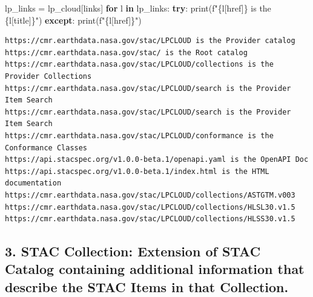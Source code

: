\documentclass[
  letterpaper,
]{scrartcl}
\newenvironment{Shaded}{}{}
\newcommand{\BuiltInTok}[1]{#1}
\newcommand{\ControlFlowTok}[1]{\textcolor[rgb]{0.00,0.44,0.13}{\textbf{#1}}}
\newcommand{\KeywordTok}[1]{\textcolor[rgb]{0.00,0.44,0.13}{\textbf{#1}}}
\newcommand{\NormalTok}[1]{#1}
\newcommand{\OperatorTok}[1]{\textcolor[rgb]{0.40,0.40,0.40}{#1}}
\newcommand{\SpecialCharTok}[1]{\textcolor[rgb]{0.25,0.44,0.63}{#1}}
\newcommand{\SpecialStringTok}[1]{\textcolor[rgb]{0.73,0.40,0.53}{#1}}
\newcommand{\StringTok}[1]{\textcolor[rgb]{0.25,0.44,0.63}{#1}}
\begin{document}
\begin{Shaded}
\begin{Highlighting}[]
\NormalTok{lp\_links }\OperatorTok{=}\NormalTok{ lp\_cloud[}\StringTok{\textquotesingle{}links\textquotesingle{}}\NormalTok{]}
\ControlFlowTok{for}\NormalTok{ l }\KeywordTok{in}\NormalTok{ lp\_links: }
    \ControlFlowTok{try}\NormalTok{: }
        \BuiltInTok{print}\NormalTok{(}\SpecialStringTok{f"}\SpecialCharTok{\{l}\NormalTok{[}\StringTok{\textquotesingle{}href\textquotesingle{}}\NormalTok{]}\SpecialCharTok{\}}\SpecialStringTok{ is the }\SpecialCharTok{\{l}\NormalTok{[}\StringTok{\textquotesingle{}title\textquotesingle{}}\NormalTok{]}\SpecialCharTok{\}}\SpecialStringTok{"}\NormalTok{)}
    \ControlFlowTok{except}\NormalTok{:}
        \BuiltInTok{print}\NormalTok{(}\SpecialStringTok{f"}\SpecialCharTok{\{l}\NormalTok{[}\StringTok{\textquotesingle{}href\textquotesingle{}}\NormalTok{]}\SpecialCharTok{\}}\SpecialStringTok{"}\NormalTok{)       }
\end{Highlighting}
\end{Shaded}

\begin{verbatim}
https://cmr.earthdata.nasa.gov/stac/LPCLOUD is the Provider catalog
https://cmr.earthdata.nasa.gov/stac/ is the Root catalog
https://cmr.earthdata.nasa.gov/stac/LPCLOUD/collections is the Provider Collections
https://cmr.earthdata.nasa.gov/stac/LPCLOUD/search is the Provider Item Search
https://cmr.earthdata.nasa.gov/stac/LPCLOUD/search is the Provider Item Search
https://cmr.earthdata.nasa.gov/stac/LPCLOUD/conformance is the Conformance Classes
https://api.stacspec.org/v1.0.0-beta.1/openapi.yaml is the OpenAPI Doc
https://api.stacspec.org/v1.0.0-beta.1/index.html is the HTML documentation
https://cmr.earthdata.nasa.gov/stac/LPCLOUD/collections/ASTGTM.v003
https://cmr.earthdata.nasa.gov/stac/LPCLOUD/collections/HLSL30.v1.5
https://cmr.earthdata.nasa.gov/stac/LPCLOUD/collections/HLSS30.v1.5
\end{verbatim}

\hypertarget{stac-collection-extension-of-stac-catalog-containing-additional-information-that-describe-the-stac-items-in-that-collection.}{%
\subsection{3. STAC Collection: Extension of STAC Catalog containing
additional information that describe the STAC Items in that
Collection.}\label{stac-collection-extension-of-stac-catalog-containing-additional-information-that-describe-the-stac-items-in-that-collection.}}
\end{document}
